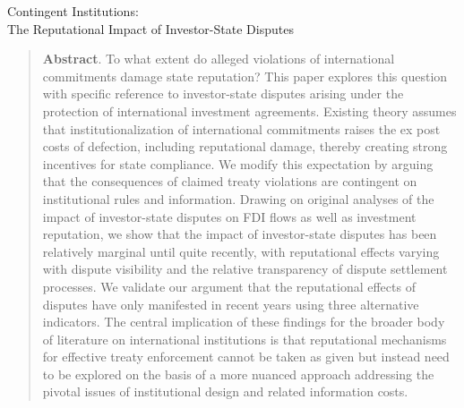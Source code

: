\documentclass[12pt,onesided]{amsart}
\begin{document}
\thispagestyle{empty}

\begin{center}
{\sc \large Contingent Institutions: \\ The Reputational Impact of Investor-State Disputes}
\end{center}



\vspace{20mm}

\begin{quote}
\noindent \textbf{Abstract}. To what extent do alleged violations of international commitments damage state reputation? This paper explores this question with specific reference to investor-state disputes arising under the protection of international investment agreements. Existing theory assumes that institutionalization of international commitments raises the ex post costs of defection, including reputational damage, thereby creating strong incentives for state compliance. We modify this expectation by arguing that the consequences of claimed treaty violations are contingent on institutional rules and information. Drawing on original analyses of the impact of investor-state disputes on  FDI flows as well as  investment reputation, we show that the impact of investor-state disputes has been relatively marginal until quite recently, with reputational effects varying with dispute visibility and the relative transparency of dispute settlement processes. We validate our argument that the reputational effects of disputes have only manifested in recent years using three alternative indicators. The central implication of these findings for the broader body of literature on international institutions is that reputational mechanisms for effective treaty enforcement cannot be taken as given but instead need to be explored on the basis of a more nuanced approach addressing the pivotal issues of institutional design and related information costs.
\end{quote}
 
\end{document}
